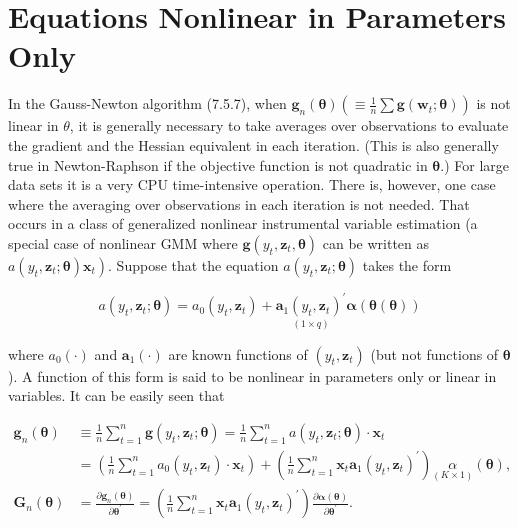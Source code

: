 \documentclass[10pt]{article}
\begin{document}
\section*{Equations Nonlinear in Parameters Only}
In the Gauss-Newton algorithm (7.5.7), when $\mathbf{g}_{n}(\boldsymbol{\theta})\left(\equiv \frac{1}{n} \sum \mathbf{g}\left(\mathbf{w}_{t} ; \boldsymbol{\theta}\right)\right)$ is not linear in $\theta$, it is generally necessary to take averages over observations to evaluate the gradient and the Hessian equivalent in each iteration. (This is also generally true in Newton-Raphson if the objective function is not quadratic in $\boldsymbol{\theta}$.) For large data sets it is a very CPU time-intensive operation. There is, however, one case where the averaging over observations in each iteration is not needed. That occurs in a class of generalized nonlinear instrumental variable estimation (a special case of nonlinear GMM where $\mathbf{g}\left(y_{t}, \mathbf{z}_{t}, \boldsymbol{\theta}\right)$ can be written as $\left.a\left(y_{t}, \mathbf{z}_{t} ; \boldsymbol{\theta}\right) \mathbf{x}_{t}\right)$. Suppose that the equation $a\left(y_{t}, \mathbf{z}_{t} ; \boldsymbol{\theta}\right)$ takes the form


\begin{equation*}
a\left(y_{t}, \mathbf{z}_{t} ; \boldsymbol{\theta}\right)=a_{0}\left(y_{t}, \mathbf{z}_{t}\right)+\underset{(1 \times q)}{\mathbf{a}_{1}\left(y_{t}, \mathbf{z}_{t}\right)^{\prime}} \boldsymbol{\alpha}(\boldsymbol{\theta}(\boldsymbol{\theta})) \tag{7.5.8}
\end{equation*}


where $a_{0}(\cdot)$ and $\mathbf{a}_{1}(\cdot)$ are known functions of $\left(y_{t}, \mathbf{z}_{t}\right)$ (but not functions of $\boldsymbol{\theta}$ ). A function of this form is said to be nonlinear in parameters only or linear in variables. It can be easily seen that


\begin{align*}
\mathbf{g}_{n}(\boldsymbol{\theta}) & \equiv \frac{1}{n} \sum_{t=1}^{n} \mathbf{g}\left(y_{t}, \mathbf{z}_{t} ; \boldsymbol{\theta}\right)=\frac{1}{n} \sum_{t=1}^{n} a\left(y_{t}, \mathbf{z}_{t} ; \boldsymbol{\theta}\right) \cdot \mathbf{x}_{t} \\
& =\left(\frac{1}{n} \sum_{t=1}^{n} a_{0}\left(y_{t}, \mathbf{z}_{t}\right) \cdot \mathbf{x}_{t}\right)+\left(\frac{1}{n} \sum_{t=1}^{n} \mathbf{x}_{t} \mathbf{a}_{1}\left(y_{t}, \mathbf{z}_{t}\right)^{\prime}\right) \underset{(K \times 1)}{\alpha}(\boldsymbol{\theta}),  \tag{7.5.9}\\
\mathbf{G}_{n}(\boldsymbol{\theta}) & =\frac{\partial \mathbf{g}_{n}(\boldsymbol{\theta})}{\partial \boldsymbol{\theta}^{\prime}}=\left(\frac{1}{n} \sum_{t=1}^{n} \mathbf{x}_{t} \mathbf{a}_{1}\left(y_{t}, \mathbf{z}_{t}\right)^{\prime}\right) \frac{\partial \boldsymbol{\alpha}(\boldsymbol{\theta})}{\partial \boldsymbol{\theta}^{\prime}} . \tag{7.5.10}
\end{align*}
\end{document}
